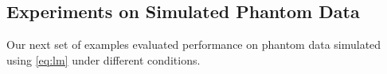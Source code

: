 \begin{comment}

Finger tapping experiment for the right hand consist in a$128\times 128 \times 22 \times 12$ with 12 replicates.  To compare consistency on the overlap measure, we reported the generalized overlap of the firsts sixth replicates, similar as \citep{maitra10}. Figure \ref{fig:Overlapmatrix} we display the overlap matrix for each hand using both AR-FAST and AM-FAST. The generalized overlap for the right hand $\ddot{\omega}_R = 0.1906$ and for the left hand $\ddot{\omega}_L = 0.2597$ Supplemental material contained the results for all 12 replicates for the right hand and results for 10 replicates of the left hand. Due some bogus in the left hand recopilation, replicates 8 and 11 were removed.

\begin{figure*}[h]
  \centering
  \subfloat[]{\texttt{[image: figures/RightHand-OverlapMatrix-Robust-6]}}
  \subfloat[]{\texttt{[image: figures/RightHand-OverlapMatrix-Likelihood-6]}}
  \\
\subfloat[]{\texttt{[image: figures/LeftHand-OverlapMatrix-Robust-6]}}
\subfloat[]{\texttt{[image: figures/LeftHand-OverlapMatrix-Likelihood-6]}}
\caption{Overlap map for left and right hand finger tapping. The first two are are right hand robust and likelihood smoothing.}
\label{fig:Overlapmatrix}
\end{figure*}
\end{comment}
\subsection{Experiments on Simulated Phantom Data}
Our next set of examples evaluated performance on phantom data
simulated using \eqref{eq:lm} under different conditions. 
